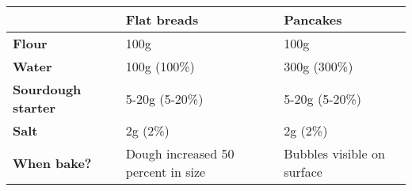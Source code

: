 


\begin{tabular}{lll}
\toprule
                           & \textbf{Flat breads} & \textbf{Pancakes}                        \\ \midrule
\textbf{Flour}             & 100g                               & 100g                       \\ \midrule
\textbf{Water}             & 100g (100\%)                       & 300g (300\%)               \\ \midrule
\textbf{Sourdough starter} & 5-20g (5-20\%)                     & 5-20g (5-20\%)             \\ \midrule
\textbf{Salt}              & 2g (2\%)                           & 2g (2\%)                   \\ \midrule
\textbf{When bake?}        & Dough increased 50 percent in size & Bubbles
visible on surface \\ \bottomrule
\end{tabular}


